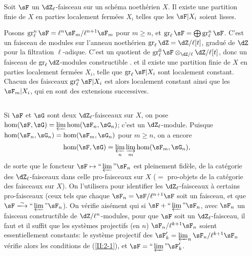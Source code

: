 \begin{proposition_}\label{II:2-5}
Soit $\sF$ un $\dZ_\ell$-faisceau sur un schéma noethérien $X$. Il existe 
une partition finie de $X$ en parties localement fermées $X_i$ telles que 
les $\sF|X_i$ soient lisses.
\end{proposition_}

Posons $\gr_\ell^n\sF=\ell^n\sF_m/\ell^{n+1}\sF_m$ pour $m\geqslant n$, et 
$\gr_\ell\sF=\bigoplus \gr_\ell^n\sF$. C'est un faisceau de modules sur 
l'anneau noethérien $\gr_\ell\dZ=\dZ/\ell[t]$, gradué de $\dZ$ pour la 
filtration $\ell$-adique. C'est un quotient de 
$\gr_\ell^0\sF \otimes_{\dZ/\ell} \dZ/\ell[t]$, donc un faisceau de 
$\gr_\ell\dZ$-modules constructible \cite[IX.2]{sga4}. et il existe une partition 
finie de $X$ en parties localement fermées $X_i$, telle que 
$\gr_\ell \sF|X_i$ sont localement constant. Chacun des faisceaux 
$\gr_\ell^n\sF|X_i$ est alors localement constant ainsi que les $\sF_m|X_i$, 
qui en sont des extensions successives. 





\subsection{}\label{II:2-6}

Si $\sF$ et $\sG$ sont deux $\dZ_\ell$-faisceaux sur $X$, on pose 
$\hom(\sF,\sG) = \varprojlim\hom(\sF_n,\sG_n)$; c'est un $\dZ_\ell$-module. 
Puisque $\hom(\sF_n,\sG_n) = \hom(\sF_m,\sG_n)$ pour $m\geqslant n$, on a 
encore 
\[
  \hom(\sF,\sG) = \varprojlim_n \varinjlim_m \hom(\sF_m,\sG_n) \text{,}
\]
de sorte que le foncteur $\sF\mapsto \text{``}\varprojlim\text{''}\sF_n$ est 
pleinement fidèle, de la catégorie des $\dZ_\ell$-faisceaux dans celle 
pro-faisceaux sur $X$ ($=$ pro-objets de la catégorie des faisceaux sur $X$). 
On l'utilisera pour identifier les $\dZ_\ell$-faisceaux à certains 
pro-faisceaux (ceux tels que chaque $\sF_n=\sF/\ell^{n+1}\sF$ soit un faisceau, 
et que $\sF\iso \text{``}\varprojlim\text{''}\sF_n$). On vérifie aisément 
qui si $\sF+\text{``}\varprojlim\text{''}\sF_n$, avec $\sF_n$ un faisceau 
constructible de $\dZ/\ell^n$-modules, pour que $\sF$ soit un 
$\dZ_\ell$-faisceau, il faut et il suffit que les systèmes projectifs (en $n$) 
$\sF_n/\ell^{k+1}\sF_n$ soient essentiellement constants: le système 
projectif des $\sF_k'=\varprojlim_n\sF_n/\ell^{k+1}\sF_n$ vérifie alors les 
conditions de (\ref{II:2-1}), et $\sF=\text{``}\varprojlim\text{''}\sF_k'$. 

